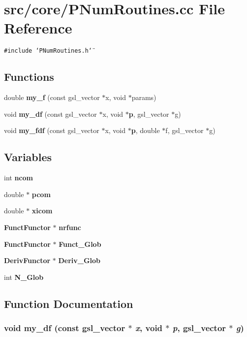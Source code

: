 \section{src/core/PNum\-Routines.cc File Reference}
\label{PNumRoutines_8cc}


{\tt \#include \char`\"{}PNum\-Routines.h\char`\"{}}\par
\subsection*{Functions}
\begin{CompactItemize}
\item 
double {\bf my\_\-f} (const gsl\_\-vector $\ast$x, void $\ast$params)
\item 
void {\bf my\_\-df} (const gsl\_\-vector $\ast$x, void $\ast${\bf p}, gsl\_\-vector $\ast$g)
\item 
void {\bf my\_\-fdf} (const gsl\_\-vector $\ast$x, void $\ast${\bf p}, double $\ast$f, gsl\_\-vector $\ast$g)
\end{CompactItemize}
\subsection*{Variables}
\begin{CompactItemize}
\item 
int {\bf ncom}
\item 
double $\ast$ {\bf pcom}
\item 
double $\ast$ {\bf xicom}
\item 
{\bf Funct\-Functor} $\ast$ {\bf nrfunc}
\item 
{\bf Funct\-Functor} $\ast$ {\bf Funct\_\-Glob}
\item 
{\bf Deriv\-Functor} $\ast$ {\bf Deriv\_\-Glob}
\item 
int {\bf N\_\-Glob}
\end{CompactItemize}


\subsection{Function Documentation}
\subsubsection{\setlength{\rightskip}{0pt plus 5cm}void my\_\-df (const gsl\_\-vector $\ast$ {\em x}, void $\ast$ {\em p}, gsl\_\-vector $\ast$ {\em g})}\label{PNumRoutines_8cc_f36eb20ebfdd587134448be9e64f47a2}


